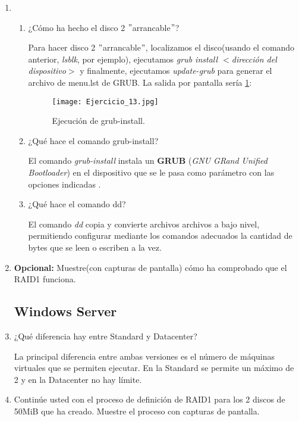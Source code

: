 \documentclass[paper=a4, fontsize=11pt]{scrartcl} %
\numberwithin{equation}{section} %
\numberwithin{figure}{section} %
\numberwithin{table}{section} %
\begin{document}
\begin{enumerate}
		
		\item \begin{enumerate}
			\item ¿Cómo ha hecho el disco 2 $"$arrancable$"$?
			
			Para hacer disco 2 $"$arrancable$"$, localizamos el disco(usando el comando anterior,
			\textit{lsblk}, por ejemplo), ejecutamos \textit{grub install $<$dirección del dispositivo$>$}
			y finalmente, ejecutamos \textit{update-grub} para generar el archivo de menu.lst de GRUB.
			La salida por pantalla sería \ref{fig:grub}:

			\begin{figure}[ht!]
				\centering
				\texttt{[image: Ejercicio\_13.jpg]}
				\caption{Ejecución de grub-install.} 	
				\label{fig:grub}
			\end{figure}

			\item ¿Qué hace el comando grub-install?
			
			El comando \textit{grub-install} instala un \textbf{GRUB} (\textit{GNU GRand Unified
			Bootloader}) en el dispositivo que se le pasa como parámetro con las opciones indicadas
			\cite{man_grub-install}.
			
			\item ¿Qué hace el comando dd?
			
			El comando \textit{dd} copia y convierte archivos archivos a bajo nivel, permitiendo configurar
			mediante los comandos adecuados la cantidad de bytes que se leen o escriben a la vez\cite{man_dd}.
			
		\end{enumerate}
		
		\item \textbf{Opcional:} Muestre(con capturas de pantalla) cómo ha comprobado que el RAID1
		funciona.
		
		
		
	\subsection{Windows Server}
		\item ¿Qué diferencia hay entre Standard y Datacenter?
		
		La principal diferencia entre ambas versiones es el número de máquinas virtuales que se
		permiten ejecutar. En la Standard se permite un máximo de 2 y en la Datacenter no hay
		límite.\cite{W12_v}

		\item Continúe usted con el proceso de definición de RAID1 para los 2 discos de 50MiB que
		ha creado. Muestre el proceso con capturas de pantalla.
		

\end{enumerate}
\end{document}
